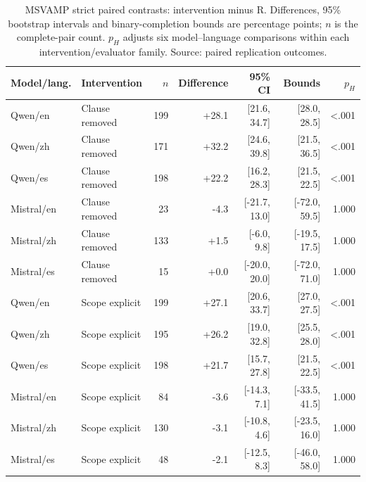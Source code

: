 \begin{table}[!htbp]\centering\small
\caption{MSVAMP strict paired contrasts: intervention minus R. Differences, 95\% bootstrap intervals and binary-completion bounds are percentage points; $n$ is the complete-pair count. $p_H$ adjusts six model--language comparisons within each intervention/evaluator family. Source: paired replication outcomes.}
\label{tab:replication_strict}
\begin{tabular}{@{}llrrrrr@{}}\toprule
Model/lang. & Intervention & $n$ & Difference & 95\% CI & Bounds & $p_H$ \\\midrule
Qwen/en & Clause removed & 199 & +28.1 & [21.6, 34.7] & [28.0, 28.5] & <.001 \\
Qwen/zh & Clause removed & 171 & +32.2 & [24.6, 39.8] & [21.5, 36.5] & <.001 \\
Qwen/es & Clause removed & 198 & +22.2 & [16.2, 28.3] & [21.5, 22.5] & <.001 \\
Mistral/en & Clause removed & 23 & -4.3 & [-21.7, 13.0] & [-72.0, 59.5] & 1.000 \\
Mistral/zh & Clause removed & 133 & +1.5 & [-6.0, 9.8] & [-19.5, 17.5] & 1.000 \\
Mistral/es & Clause removed & 15 & +0.0 & [-20.0, 20.0] & [-72.0, 71.0] & 1.000 \\
Qwen/en & Scope explicit & 199 & +27.1 & [20.6, 33.7] & [27.0, 27.5] & <.001 \\
Qwen/zh & Scope explicit & 195 & +26.2 & [19.0, 32.8] & [25.5, 28.0] & <.001 \\
Qwen/es & Scope explicit & 198 & +21.7 & [15.7, 27.8] & [21.5, 22.5] & <.001 \\
Mistral/en & Scope explicit & 84 & -3.6 & [-14.3, 7.1] & [-33.5, 41.5] & 1.000 \\
Mistral/zh & Scope explicit & 130 & -3.1 & [-10.8, 4.6] & [-23.5, 16.0] & 1.000 \\
Mistral/es & Scope explicit & 48 & -2.1 & [-12.5, 8.3] & [-46.0, 58.0] & 1.000 \\
\bottomrule\end{tabular}\end{table}
